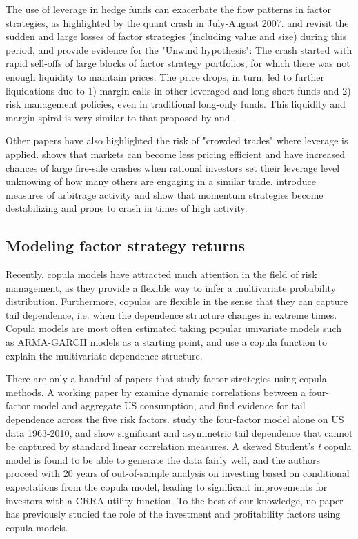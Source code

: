 The use of leverage in hedge funds can exacerbate the flow patterns in factor strategies, as highlighted by the quant crash in July-August 2007. \textcite{KhandaniLo2011} and \textcite{KhandaniLo2007} revisit the sudden and large losses of factor strategies (including value and size) during this period, and provide evidence for the "Unwind hypothesis": The crash started with rapid sell-offs of large blocks of factor strategy portfolios, for which there was not enough liquidity to maintain prices. The price drops, in turn, led to further liquidations due to 1) margin calls in other leveraged and long-short funds and 2) risk management policies, even in traditional long-only funds. This liquidity and margin spiral is very similar to that proposed by \textcite{Brunnermeier2009} and \textcite{BrunnermeierPedersen2009}.

Other papers have also highlighted the risk of "crowded trades" where leverage is applied. \textcite{Stein2009} shows that markets can become less pricing efficient and have increased chances of large fire-sale crashes when rational investors set their leverage level unknowing of how many others are engaging in a similar trade. \textcite{LouPolk2013} introduce measures of arbitrage activity and show that momentum strategies become destabilizing and prone to crash in times of high activity.

\subsection{Modeling factor strategy returns}

Recently, copula models have attracted much attention in the field of risk management, as they provide a flexible way to infer a multivariate probability distribution. Furthermore, copulas are flexible in the sense that they can capture tail dependence, i.e. when the dependence structure changes in extreme times. Copula models are most often estimated taking popular univariate models such as ARMA-GARCH models as a starting point, and use a copula function to explain the multivariate dependence structure.

There are only a handful of papers that study factor strategies using copula methods. A working paper by \textcite{CholleteNing2012} examine dynamic correlations between a four-factor model and aggregate US consumption, and find evidence for tail dependence across the five risk factors. \textcite{ChristoffersenLanglois2013} study the four-factor model alone on US data 1963-2010, and show significant and asymmetric tail dependence that cannot be captured by standard linear correlation measures. A skewed Student's \textit{t} copula model is found to be able to generate the data fairly well, and the authors proceed with 20 years of out-of-sample analysis on investing based on conditional expectations from the copula model, leading to significant improvements for investors with a CRRA utility function. To the best of our knowledge, no paper has previously studied the role of the investment and profitability factors using copula models.
